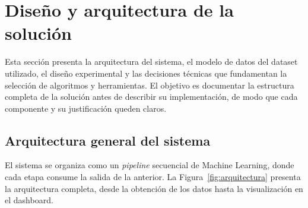 \documentclass[11pt,a4paper]{article}
\begin{document}
\section{Diseño y arquitectura de la solución}
Esta sección presenta la arquitectura del sistema, el modelo de datos del dataset utilizado, el diseño experimental y las decisiones técnicas que fundamentan la selección de algoritmos y herramientas. El objetivo es documentar la estructura completa de la solución antes de describir su implementación, de modo que cada componente y su justificación queden claros.

\subsection{Arquitectura general del sistema}
El sistema se organiza como un \textit{pipeline} secuencial de Machine Learning, donde cada etapa consume la salida de la anterior. La Figura~\ref{fig:arquitectura} presenta la arquitectura completa, desde la obtención de los datos hasta la visualización en el dashboard.
\end{document}
